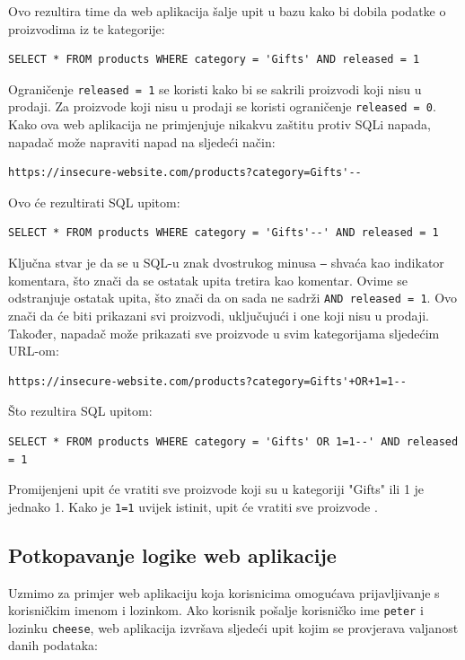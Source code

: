 \documentclass[12pt, oneside, onecolumn]{book}
\begin{document}
{Ovo rezultira time da web aplikacija šalje upit u bazu kako bi dobila podatke o proizvodima iz te kategorije:

\begin{verbatim}
SELECT * FROM products WHERE category = 'Gifts' AND released = 1
\end{verbatim}

Ograničenje \texttt{released = 1} se koristi kako bi se sakrili proizvodi koji nisu u prodaji. Za proizvode koji nisu u prodaji se koristi ograničenje \texttt{released = 0}. Kako ova web aplikacija ne primjenjuje nikakvu zaštitu protiv SQLi napada, napadač može napraviti napad na sljedeći način:

\begin{verbatim}
https://insecure-website.com/products?category=Gifts'--
\end{verbatim}

Ovo će rezultirati SQL upitom:

\begin{verbatim}
SELECT * FROM products WHERE category = 'Gifts'--' AND released = 1
\end{verbatim}

Ključna stvar je da se u SQL-u znak dvostrukog minusa \texttt{--} shvaća kao indikator komentara, što znači da se ostatak upita tretira kao komentar. Ovime se odstranjuje ostatak upita, što znači da on sada ne sadrži \texttt{AND released = 1}. Ovo znači da će biti prikazani svi proizvodi, uključujući i one koji nisu u prodaji. Također, napadač može prikazati sve proizvode u svim kategorijama sljedećim URL-om:

\begin{verbatim}
https://insecure-website.com/products?category=Gifts'+OR+1=1--
\end{verbatim}

Što rezultira SQL upitom:

\begin{verbatim}
SELECT * FROM products WHERE category = 'Gifts' OR 1=1--' AND released = 1
\end{verbatim}

Promijenjeni upit će vratiti sve proizvode koji su u kategoriji "Gifts" ili 1 je jednako 1. Kako je \texttt{1=1} uvijek istinit, upit će vratiti sve proizvode \cite{sitesqli}.

\subsection{Potkopavanje logike web aplikacije}
Uzmimo za primjer web aplikaciju koja korisnicima omogućava prijavljivanje s korisničkim imenom i lozinkom. Ako korisnik pošalje korisničko ime \texttt{peter} i lozinku \texttt{cheese}, web aplikacija izvršava sljedeći upit kojim se provjerava valjanost danih podataka:

}
\end{document}
